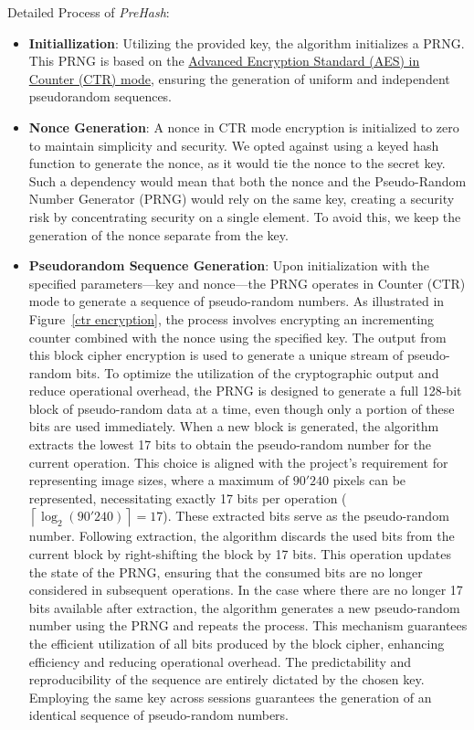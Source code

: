 Detailed Process of \textit{PreHash}:
\begin{itemize}
    \item \textbf{Initiallization}: Utilizing the provided key, the algorithm initializes a PRNG. This PRNG is based on the \hyperref[def:AES CTR mode]{Advanced Encryption Standard (AES) in Counter (CTR) mode}, ensuring the generation of uniform and independent pseudorandom sequences.

    \item \textbf{Nonce Generation}: A nonce in CTR mode encryption is initialized to zero to maintain simplicity and security. We opted against using a keyed hash function to generate the nonce, as it would tie the nonce to the secret key. Such a dependency would mean that both the nonce and the Pseudo-Random Number Generator (PRNG) would rely on the same key, creating a security risk by concentrating security on a single element. To avoid this, we keep the generation of the nonce separate from the key.

    \item \textbf{Pseudorandom Sequence Generation}: Upon initialization with the specified parameters—key and nonce—the PRNG operates in Counter (CTR) mode to generate a sequence of pseudo-random numbers. As illustrated in Figure~\ref{ctr encryption}, the process involves encrypting an incrementing counter combined with the nonce using the specified key. The output from this block cipher encryption is used to generate a unique stream of pseudo-random bits.
    To optimize the utilization of the cryptographic output and reduce operational overhead, the PRNG is designed to generate a full 128-bit block of pseudo-random data at a time, even though only a portion of these bits are used immediately. When a new block is generated, the algorithm extracts the lowest 17 bits to obtain the pseudo-random number for the current operation. This choice is aligned with the project's requirement for representing image sizes, where a maximum of \(90'240\) pixels can be represented, necessitating exactly 17 bits per operation (\(\left\lceil \log_2(90'240) \right\rceil = 17\)). These extracted bits serve as the pseudo-random number.
    Following extraction, the algorithm discards the used bits from the current block by right-shifting the block by 17 bits. This operation updates the state of the PRNG, ensuring that the consumed bits are no longer considered in subsequent operations. In the case where there are no longer 17 bits available after extraction, the algorithm generates a new pseudo-random number using the PRNG and repeats the process. This mechanism guarantees the efficient utilization of all bits produced by the block cipher, enhancing efficiency and reducing operational overhead.
    The predictability and reproducibility of the sequence are entirely dictated by the chosen key. Employing the same key across sessions guarantees the generation of an identical sequence of pseudo-random numbers.
    

\end{itemize}
